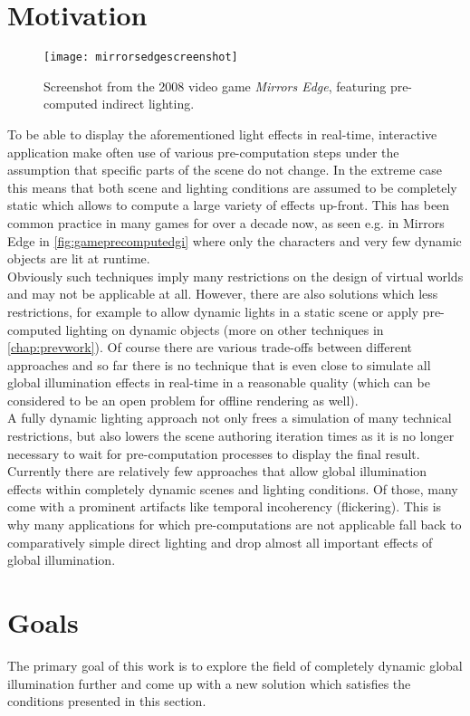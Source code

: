 \documentclass[thesis.tex]{subfiles}
\begin{document}
\section{Motivation} 
\begin{figure}[h]
\centering
\texttt{[image: mirrorsedgescreenshot]}
\caption{Screenshot from the 2008 video game \emph{Mirrors Edge}, featuring pre-computed indirect lighting.}
\label{fig:gameprecomputedgi}
\end{figure}
To be able to display the aforementioned light effects in real-time, interactive application make often use of various pre-computation steps under the assumption that specific parts of the scene do not change.
In the extreme case this means that both scene and lighting conditions are assumed to be completely static which allows to compute a large variety of effects up-front.
This has been common practice in many games for over a decade now, as seen e.g. in Mirrors Edge in \autoref{fig:gameprecomputedgi} where only the characters and very few dynamic objects are lit at runtime.
\\
Obviously such techniques imply many restrictions on the design of virtual worlds and may not be applicable at all.
However, there are also solutions which less restrictions, for example to allow dynamic lights in a static scene or apply pre-computed lighting on dynamic objects (more on other techniques in \autoref{chap:prevwork}).
Of course there are various trade-offs between different approaches and so far there is no technique that is even close to simulate all global illumination effects in real-time in a reasonable quality (which can be considered to be an open problem for offline rendering as well).
\\
A fully dynamic lighting approach not only frees a simulation of many technical restrictions, but also lowers the scene authoring iteration times as it is no longer necessary to wait for pre-computation processes to display the final result.
Currently there are relatively few approaches that allow global illumination effects within completely dynamic scenes and lighting conditions.
Of those, many come with a prominent artifacts like temporal incoherency (flickering).
This is why many applications for which pre-computations are not applicable fall back to comparatively simple direct lighting and drop almost all important effects of global illumination.

\section{Goals} \label{bib:goals}
The primary goal of this work is to explore the field of completely dynamic global illumination further and come up with a new solution which satisfies the conditions presented in this section.
\end{document}
